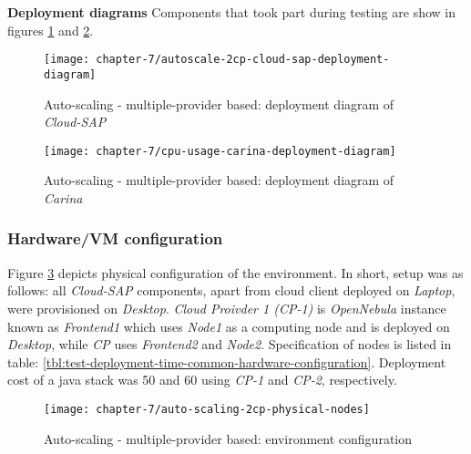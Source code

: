 \begin{asparaenum}
  
  
  \item[\textbf{Deployment diagrams}] Components that took part during testing are show in figures \ref{eval:autoscale-2cp-cloud-sap-deployment-diagram} and \ref{eval:auto-scaling-2cp-carina-deployment-diagram}.

  \begin{figure}[!ht]
    \begin{center}
      \texttt{[image: chapter-7/autoscale-2cp-cloud-sap-deployment-diagram]}
    \end{center}
    \caption{Auto-scaling - multiple-provider based: deployment diagram of \emph{Cloud-SAP}}
    \label{eval:autoscale-2cp-cloud-sap-deployment-diagram}
  \end{figure}
  
  \begin{figure}[!ht]
    \begin{center}
      \texttt{[image: chapter-7/cpu-usage-carina-deployment-diagram]}
    \end{center}
    \caption{Auto-scaling - multiple-provider based: deployment diagram of \emph{Carina}}
    \label{eval:auto-scaling-2cp-carina-deployment-diagram}
  \end{figure}
\end{asparaenum}

\subsubsection*{Hardware/VM configuration}

Figure \ref{eval:auto-scaling-2cp-physical-nodes} depicts physical configuration of the environment. In short, setup was as follows: all \emph{Cloud-SAP} components, apart from cloud client deployed on \emph{Laptop}, were provisioned on \emph{Desktop}. \emph{Cloud Proivder 1 (CP-1)} is \emph{OpenNebula} instance known as \emph{Frontend1} which uses \emph{Node1} as a computing node and is deployed on \emph{Desktop}, while \emph{CP} uses \emph{Frontend2} and \emph{Node2}. Specification of nodes is listed in table: \ref{tbl:test-deployment-time-common-hardware-configuration}. Deployment cost of a java stack was 50 and 60 using \emph{CP-1} and \emph{CP-2}, respectively.

\begin{figure}[!ht]
  \begin{center}
    \texttt{[image: chapter-7/auto-scaling-2cp-physical-nodes]}
  \end{center}
  \caption{Auto-scaling - multiple-provider based: environment configuration}
  \label{eval:auto-scaling-2cp-physical-nodes}
\end{figure}

